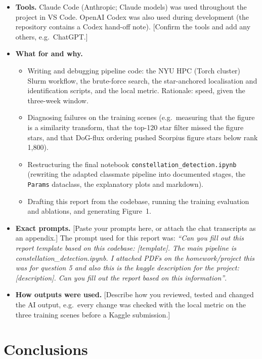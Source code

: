 \documentclass[a4paper,11pt]{article}
\newcommand{\fillin}[1]{{\color{red}[#1]}}
\begin{document}
\begin{itemize}
\item \textbf{Tools.} Claude Code (Anthropic; Claude models) was used throughout the project in VS Code. OpenAI Codex was
also used during development (the repository contains a Codex hand-off note). \fillin{Confirm the tools and add any
others, e.g.\ ChatGPT.}
\item \textbf{What for and why.}
  \begin{itemize}
  \item Writing and debugging pipeline code: the NYU HPC (Torch cluster) Slurm workflow, the brute-force search, the
  star-anchored localisation and identification scripts, and the local metric. Rationale: speed, given the
  three-week window.
  \item Diagnosing failures on the training scenes (e.g.\ measuring that the figure is a similarity transform, that
  the top-120 star filter missed the figure stars, and that DoG-flux ordering pushed Scorpius figure stars below rank
  1,800).
  \item Restructuring the final notebook \texttt{constellation\_detection.ipynb} (rewriting the adapted classmate
  pipeline into documented stages, the \texttt{Params} dataclass, the explanatory plots and markdown).
  \item Drafting this report from the codebase, running the training evaluation and ablations, and generating
  Figure~1.
  \end{itemize}
\item \textbf{Exact prompts.} \fillin{Paste your prompts here, or attach the chat transcripts as an appendix.} The prompt
used for this report was: \emph{``Can you fill out this report template based on this codebase: [template]. The main
pipeline is constellation\_detection.ipynb. I attached PDFs on the homework/project this was for question 5 and also this is
the kaggle description for the project: [description]. Can you fill out the report based on this information''}.
\item \textbf{How outputs were used.} \fillin{Describe how you reviewed, tested and changed the AI output, e.g.\ every
change was checked with the local metric on the three training scenes before a Kaggle submission.}
\end{itemize}

\section{Conclusions}
\end{document}
